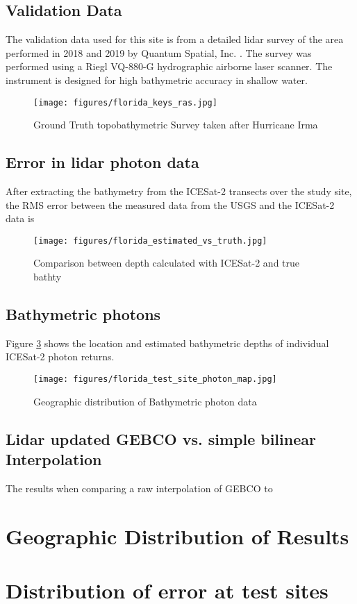 \subsection{Validation Data}
The validation data used for this site is from a detailed lidar survey of the area performed in 2018 and 2019 by Quantum Spatial, Inc. \parencite{Keys2019Lidar}. The survey was performed using a Riegl VQ-880-G hydrographic airborne laser scanner. The instrument is designed for high bathymetric accuracy in shallow water.
\begin{figure}[h!]
    \centering
    \texttt{[image: figures/florida\_keys\_ras.jpg]}
    \caption{Ground Truth topobathymetric Survey taken after Hurricane Irma}
    \label{fig:truebathy}
\end{figure}
\subsection{Error in lidar photon data}
After extracting the bathymetry from the ICESat-2 transects over the study site, the RMS error between the measured data from the USGS and the ICESat-2 data is
\begin{figure}[htbp]
    \centering
    \texttt{[image: figures/florida\_estimated\_vs\_truth.jpg]}
    \caption{Comparison between depth calculated with ICESat-2 and true bathty}
    \label{fig:fl_truth_vs_measured_points}
\end{figure}
% 

% 

\subsection{Bathymetric photons}
Figure \ref{fig:bathyphotonmap} shows the location and estimated bathymetric depths of individual ICESat-2 photon returns.
\begin{figure}[h!]
    \centering
    \texttt{[image: figures/florida\_test\_site\_photon\_map.jpg]}
    \caption{Geographic distribution of Bathymetric photon data}
    \label{fig:bathyphotonmap}
\end{figure}

\subsection{Lidar updated GEBCO vs. simple bilinear Interpolation}
The results when comparing a raw interpolation of GEBCO to 

\section{Geographic Distribution of Results}
\section{Distribution of error at test sites}